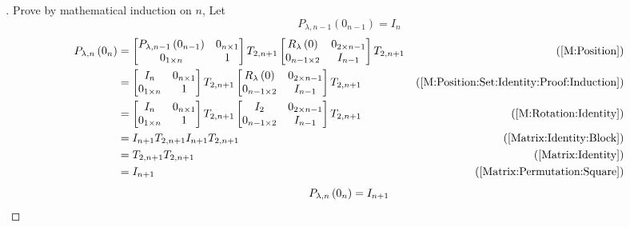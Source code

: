 \documentclass[../main.tex]{subfiles}
\begin{document}
\begin{proof}[]
Prove by mathematical induction on \(n\),
Let
\begin{equation}\label{M:Position:Set:Identity:Proof:Induction}
P_{\lambda,n-1}\left(0_{n-1}\right)=I_n
\end{equation}
\begin{align*}
P_{\lambda, n}\left(0_{n}\right)
&=
\begin{bmatrix}
P_{\lambda,n-1}\left(0_{n-1}\right)&0_{n\times 1}\\
0_{1\times n}&1\\
\end{bmatrix}
T_{2, n+1}
\begin{bmatrix}
R_{\lambda}\left(0\right)&0_{{2}\times{n-1}}\\
0_{{n-1}\times{2}}&{I}_{n-1}\\
\end{bmatrix}
T_{2, n+1}
&\text{(\cref{M:Position})}\\
&=
\begin{bmatrix}
I_{n}&0_{n\times 1}\\
0_{1\times n}&1\\
\end{bmatrix}
T_{2, n+1}
\begin{bmatrix}
R_{\lambda}\left(0\right)&0_{{2}\times{n-1}}\\
0_{{n-1}\times{2}}&{I}_{n-1}\\
\end{bmatrix}
T_{2, n+1}
&\text{(\cref{M:Position:Set:Identity:Proof:Induction})}\\
&=
\begin{bmatrix}
I_{n}&0_{n\times 1}\\
0_{1\times n}&1\\
\end{bmatrix}
T_{2, n+1}
\begin{bmatrix}
I_{2}&0_{{2}\times{n-1}}\\
0_{{n-1}\times{2}}&{I}_{n-1}\\
\end{bmatrix}
T_{2, n+1}
&\text{(\cref{M:Rotation:Identity})}\\
&=
I_{n+1}
T_{2, n+1}
I_{n+1}
T_{2, n+1}
&\text{(\cref{Matrix:Identity:Block})}\\
&=
T_{2, n+1}
T_{2, n+1}
&\text{(\cref{Matrix:Identity})}\\
&=
I_{n+1}
&\text{(\cref{Matrix:Permutation:Square})}
\end{align*}
\[
P_{\lambda,n}
\left(0_{n}\right)
=
I_{n+1}
\qedhere
\]
\end{proof}
\end{document}
